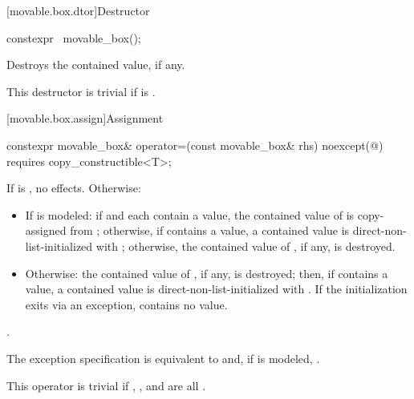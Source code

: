 [movable.box.dtor]{Destructor}

%
\begin{itemdecl}
constexpr ~movable_box();
\end{itemdecl}

\begin{itemdescr}
\pnum
\effects
Destroys the contained value, if any.

\pnum
\remarks
This destructor is trivial if  is .
\end{itemdescr}

[movable.box.assign]{Assignment}

%
\begin{itemdecl}
constexpr movable_box& operator=(const movable_box& rhs) noexcept(@\seebelow@)
  requires copy_constructible<T>;
\end{itemdecl}

\begin{itemdescr}
\pnum
\effects
If  is , no effects. Otherwise:
\begin{itemize}
\item If  is modeled: if  and  each contain a value, the contained value of  is copy-assigned from ; otherwise, if  contains a value, a contained value is direct-non-list-initialized with ; otherwise, the contained value of , if any, is destroyed.
\item Otherwise: the contained value of , if any, is destroyed; then, if  contains a value, a contained value is direct-non-list-initialized with . If the initialization exits via an exception,  contains no value.
\end{itemize}

\pnum
\returns
{}.

\pnum
\remarks
The exception specification is equivalent to  and, if  is modeled, .

\pnum
This operator is trivial if , , and  are all .
\end{itemdescr}

